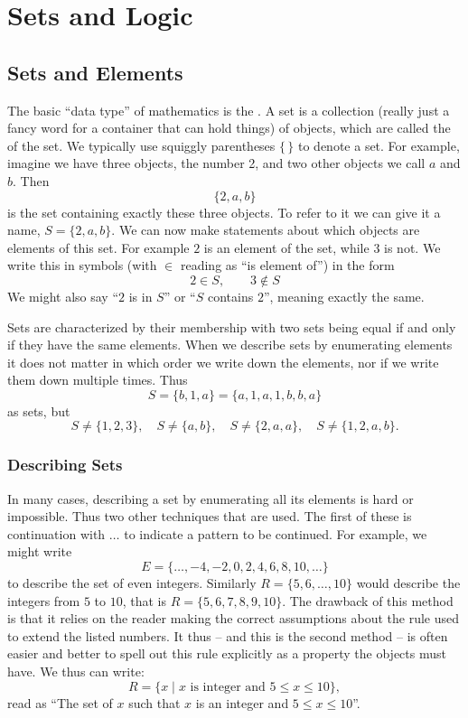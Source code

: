 \chapter{Sets and Logic}
\label{chsets}
\section{Sets and Elements}

The basic ``data type'' of mathematics is the . A set is a
collection (really just a fancy word for a container that can hold things)
of objects, which are called the  of the set. 
We typically use squiggly parentheses $\{\,\}$ to denote a set.
For example,
imagine we have three objects, the number 2, and two other objects we call
$a$ and $b$. Then 
\[
\{2,a,b\}
\]
is the set containing exactly these three objects. To refer to it we can give it
a name, $S=\{2,a,b\}$. 
We can now make statements about which objects are elements of this set. For
example $2$ is an element of the set, while $3$ is not. We write this in
symbols (with $\in$ reading as ``is element of'') in the form
\[
2\in S,\qquad 3\not\in S
\]
We might also say ``$2$ is in $S$'' or ``$S$ contains $2$'', meaning exactly
the same.

Sets are characterized by their membership with two sets being equal if and
only if they have the same elements.
When we describe sets
by enumerating elements it does not matter in which order we write down the
elements, nor if we write them down multiple times.
Thus
\[
S=\{b,1,a\}=\{a,1,a,1,b,b,a\}
\]
as sets, but 
\[
S\not=\{1,2,3\},\quad S\not=\{a,b\},\quad S\not=\{2,a,a\},\quad
S\not=\{1,2,a,b\}.
\]

\subsection{Describing Sets}

In many cases, describing a set by enumerating all its elements is
hard or impossible. Thus two other techniques that are used. The first of
these is continuation with
$\ldots$ to indicate a pattern to be continued. For example, we might write
\[
E=\{\ldots,-4,-2,0,2,4,6,8,10,\ldots\}
\]
to describe the set of even integers. Similarly
$R=\{5,6,\ldots,10\}$ would describe the integers from $5$ to $10$, that is
$R=\{5,6,7,8,9,10\}$. The drawback of this method is that it relies on the
reader making the correct assumptions about the rule used to extend the
listed numbers. It thus -- and this is the second method -- is often easier
and better to spell out this rule explicitly as a property the objects must
have. We thus can write:
\[
R=\{x\mid \mbox{$x$ is integer and $5\le x\le 10$}\},
\]
read as ``The set of $x$ such that $x$ is an integer and $5\le x\le 10$''.

